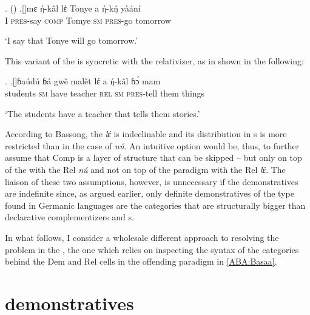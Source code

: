 \ex.  (\citealt[ex. 30a in \S3]{Bassong2010})\label{bassong-ch3}
\ag.[]\hspace{-22pt}mɛ ŋ́-k\^al lέ Tonye a ŋ́-kŋ́ y\`a\'an\'i\\
\hspace{-22pt}I \textsc{pres}-say \textsc{comp} Tomye \textsc{sm} \textsc{pres}-go tomorrow\\
\hspace{-22pt}\strut `I say that Tonye will go tomorrow.'

This variant of the  is syncretic with the relativizer, as in shown in the following:

\ex. \citet[ex. 22b in \S4]{Bassong2010}\label{le-rel}
\ag.[]\hspace{-22pt}ɓa\'ud\'u ɓ\'a gw\v{e} mal\v{e}t lέ a ŋ́-k\^al ɓɔ́ mam\\
\hspace{-22pt}students \textsc{sm} have teacher \textsc{rel} \textsc{sm} \textsc{pres-}tell them things\\
\hspace{-22pt}\strut `The students have a teacher that tells them stories.' 

According to Bassong, the  \textit{lέ} is indeclinable and its distribution in s is more restricted than in the case of \textit{n\'u}. 
An intuitive option would be, thus, to further assume that Comp is a layer of structure that can be skipped -- but only on top of the  with the Rel \textit{n\'u} and not on top of the paradigm with the Rel \textit{lέ}. The liaison of these two assumptions, however, is unnecessary if the  demonstratives are indefinite since, as argued earlier, only definite demonstratives of the type found in Germanic languages are the categories that are structurally bigger than declarative complementizers and s. 
\par
In what follows, I consider a wholesale different approach to resolving the   problem in the , the one which relies on inspecting the syntax of the categories behind the Dem and Rel cells in the offending paradigm in \ref{ABA:Basaa}.

\section{ demonstratives}

